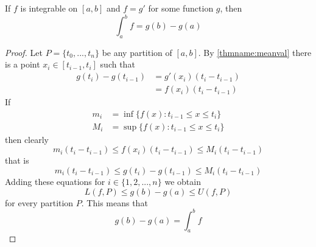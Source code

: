 \documentclass[12pt, a4paper, oneside, openright, titlepage]{book}
\begin{document}
\begin{namthm}\label{thmname:FTC2}
    If $f$ is integrable on $[a,b]$ and $f = g'$ for some function $g$, then \begin{equation*}
        \int_a^bf = g(b) - g(a)
    \end{equation*}
\end{namthm}
\begin{proof}
    Let $P = \{t_0,...,t_n\}$ be any partition of $[a,b]$. By \ref{thmname:meanval} there is a point $x_i \in [t_{i-1},t_i]$ such that \begin{align*}
        g(t_i) - g(t_{i-1}) &= g'(x_i)(t_i-t_{i-1}) \\
        &= f(x_i)(t_i-t_{i-1})
    \end{align*}
    If \begin{align*}
        m_i &= \inf\{f(x):t_{i-1} \leq x \leq t_i\} \\
        M_i &= \sup\{f(x):t_{i-1} \leq x \leq t_i\}
    \end{align*}
    then clearly \begin{equation*}
        m_i(t_i-t_{i-1}) \leq f(x_i)(t_i-t_{i-1}) \leq M_i(t_i-t_{i-1})
    \end{equation*}
    that is \begin{equation*}
        m_i(t_i-t_{i-1}) \leq g(t_i) - g(t_{i-1}) \leq M_i(t_i-t_{i-1})
    \end{equation*}
    Adding these equations for $i \in \{1,2,...,n\}$ we obtain \begin{equation*}
        L(f,P) \leq g(b) - g(a) \leq U(f,P)
    \end{equation*}
    for every partition $P$. This means that \begin{equation*}
        g(b) - g(a) = \int_a^bf
    \end{equation*}
\end{proof}
\end{document}
